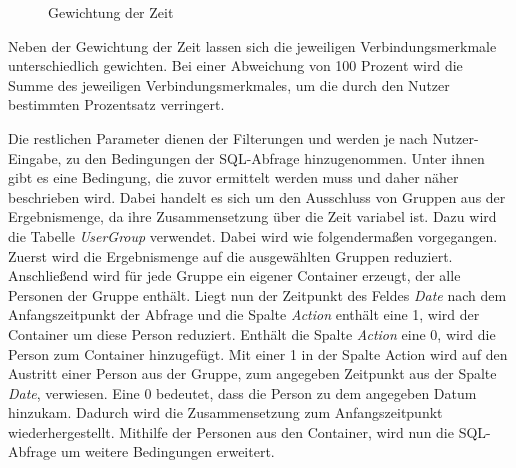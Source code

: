 \begin{figure}[htbp]
\begin{center}
\end{center}
\caption{Gewichtung der Zeit}
\label{fig:umsetzung:gewichtungderzeit}
\end{figure}

Neben der Gewichtung der Zeit lassen sich die jeweiligen Verbindungsmerkmale unterschiedlich gewichten. Bei einer Abweichung von 100 Prozent wird die Summe des jeweiligen Verbindungsmerkmales, um die durch den Nutzer bestimmten Prozentsatz verringert. 

Die restlichen Parameter dienen der Filterungen und werden je nach Nutzer-Eingabe, zu den Bedingungen der SQL-Abfrage hinzugenommen. Unter ihnen gibt es eine Bedingung, die zuvor ermittelt werden muss und daher näher beschrieben wird. Dabei handelt es sich um den Ausschluss von Gruppen aus der Ergebnismenge, da ihre Zusammensetzung über die Zeit variabel ist. Dazu wird die Tabelle \textit{UserGroup} verwendet. Dabei wird wie folgendermaßen vorgegangen. Zuerst wird die Ergebnismenge auf die ausgewählten Gruppen reduziert. Anschließend wird für jede Gruppe ein eigener Container erzeugt, der alle Personen der Gruppe enthält. Liegt nun der Zeitpunkt des Feldes \textit{Date} nach dem Anfangszeitpunkt der Abfrage und die Spalte \textit{Action} enthält eine 1, wird der Container um diese Person reduziert. Enthält die Spalte \textit{Action} eine 0, wird die Person zum Container hinzugefügt. Mit einer 1 in der Spalte Action wird auf den Austritt einer Person aus der Gruppe, zum angegeben Zeitpunkt aus der Spalte \textit{Date}, verwiesen. Eine 0 bedeutet, dass die Person zu dem angegeben Datum hinzukam. Dadurch wird die Zusammensetzung zum Anfangszeitpunkt wiederhergestellt. Mithilfe der Personen aus den Container, wird nun die SQL-Abfrage um weitere Bedingungen erweitert.

